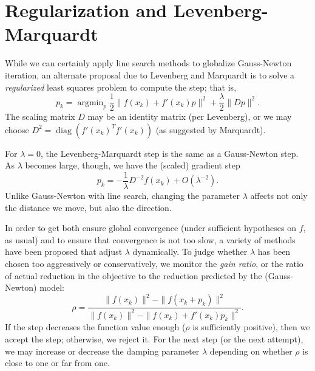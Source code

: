 \documentclass[12pt, leqno]{article} %
\begin{document}
\section{Regularization and Levenberg-Marquardt}

While we can certainly apply line search methods to globalize
Gauss-Newton iteration, an alternate proposal due to Levenberg and
Marquardt is to solve a {\em regularized} least squares problem to
compute the step; that is,
\[
p_k =
\operatorname{argmin}_p
  \frac{1}{2} \|f(x_k) + f'(x_k) p\|^2 +
  \frac{\lambda}{2} \|Dp\|^2.
\]
The scaling matrix $D$ may be an identity matrix (per Levenberg),
or we may choose $D^2 = \operatorname{diag}(f'(x_k)^T f'(x_k))$
(as suggested by Marquardt).

For $\lambda = 0$, the Levenberg-Marquardt step is the same as
a Gauss-Newton step.  As $\lambda$ becomes large, though, we have
the (scaled) gradient step
\[
  p_k = -\frac{1}{\lambda} D^{-2} f(x_k) + O(\lambda^{-2}).
\]
Unlike Gauss-Newton with line search, changing the parameter $\lambda$
affects not only the distance we move, but also the direction.

In order to get both ensure global convergence (under sufficient
hypotheses on $f$, as usual) and to ensure that convergence is not
too slow, a variety of methods have been proposed that adjust
$\lambda$ dynamically.  To judge whether $\lambda$ has been chosen
too aggressively or conservatively, we monitor the {\em gain ratio}, or the
ratio of actual reduction in the objective to the reduction predicted
by the (Gauss-Newton) model:
\[
  \rho =
  \frac{\|f(x_k)\|^2-\|f(x_k+p_k)\|^2}
       {\|f(x_k)\|^2 - \|f(x_k)+f'(x_k)p_k\|^2}.
\]
If the step decreases the function value enough ($\rho$ is
sufficiently positive), then we accept the step; otherwise,
we reject it.  For the next step (or the next attempt), we
may increase or decrease the damping parameter $\lambda$
depending on whether $\rho$ is close to one or far from one.
\end{document}
